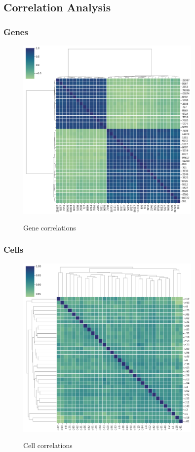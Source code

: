 \documentclass[bsc,frontabs,twoside,singlespacing,parskip,deptreport]{infthesis}     %
\let\Oldsubsection\subsection
\renewcommand{\subsection}{\FloatBarrier\Oldsubsection}
\let\Oldsubsubsection\subsubsection
\renewcommand{\subsubsection}{\FloatBarrier\Oldsubsubsection}
\begin{document}
\subsection{Correlation Analysis}
\subsubsection{Genes}
\begin{figure}[h!]
\centering
\caption{Gene correlations}
\includegraphics[height=9cm]{images/gene_corr.png}\label{gene corr}
\end{figure}
\subsubsection{Cells}
\begin{figure}[h!]
\centering
\caption{Cell correlations}
\includegraphics[height=9cm]{images/cell_corr.png}\label{gene corr}
\end{figure}
\end{document}
